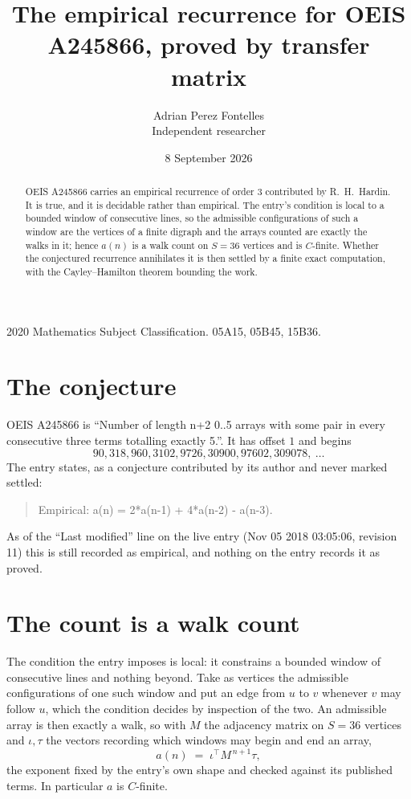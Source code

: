 \documentclass[11pt,a4paper]{article}
\title{The empirical recurrence for OEIS A245866, proved by transfer matrix}
\author{Adrian Perez Fontelles\\ \small Independent researcher}
\date{8 September 2026}
\theoremstyle{plain}
\theoremstyle{definition}
\begin{document}
\maketitle

\begin{abstract}
OEIS A245866 carries an empirical recurrence of order $3$ contributed by R.~H.~Hardin. It is
true, and it is decidable rather than empirical. The entry's condition is local to a bounded window of consecutive lines, so
the admissible configurations of such a window are the vertices of a finite digraph and the
arrays counted are exactly the walks in it; hence $a(n)$ is a walk count on $S=36$ vertices
and is $C$-finite. Whether the conjectured recurrence annihilates it is then settled by a
finite exact computation, with the Cayley--Hamilton theorem bounding the work.
\end{abstract}

\noindent\small 2020 Mathematics Subject Classification. 05A15, 05B45, 15B36.\normalsize

\section{The conjecture}

OEIS A245866 is ``Number of length n+2 0..5 arrays with some pair in every consecutive three terms totalling exactly 5.''. It has offset $1$ and begins
\[
90, 318, 960, 3102, 9726, 30900, 97602, 309078,\ \dots
\]
The entry states, as a conjecture contributed by its author and never marked settled:
\begin{quote}
Empirical: a(n) = 2*a(n-1) + 4*a(n-2) - a(n-3).
\end{quote}
As of the ``Last modified'' line on the live entry (Nov 05 2018 03:05:06, revision 11) this is still
recorded as empirical, and nothing on the entry records it as proved.

\section{The count is a walk count}

The condition the entry imposes is local: it constrains a bounded window of consecutive lines and nothing beyond. Take as
vertices the admissible configurations of one such window and put an edge from $u$ to $v$
whenever $v$ may follow $u$, which the condition decides by inspection of the two. An
admissible array is then exactly a walk, so with $M$ the adjacency matrix on $S=36$ vertices
and $\iota,\tau$ the vectors recording which windows may begin and end an array,
\[
a(n)\;=\;\iota^{\!\top}M^{\,n+1}\tau ,
\]
the exponent fixed by the entry's own shape and checked against its published terms. In
particular $a$ is $C$-finite.
\end{document}
